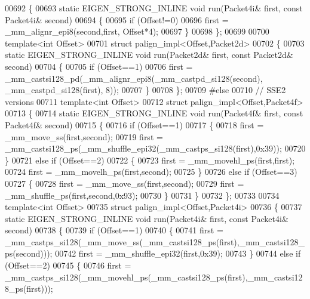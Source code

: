 \begin{DoxyCode}
{{00692 \{
00693   \textcolor{keyword}{static} EIGEN\_STRONG\_INLINE \textcolor{keywordtype}{void} run(Packet4i& first, \textcolor{keyword}{const} Packet4i& second)
00694   \{
00695     \textcolor{keywordflow}{if} (Offset!=0)
00696       first = \_mm\_alignr\_epi8(second,first, Offset*4);
00697   \}
00698 \};
00699 
00700 \textcolor{keyword}{template}<\textcolor{keywordtype}{int} Offset>
00701 \textcolor{keyword}{struct }palign\_impl<Offset,Packet2d>
00702 \{
00703   \textcolor{keyword}{static} EIGEN\_STRONG\_INLINE \textcolor{keywordtype}{void} run(Packet2d& first, \textcolor{keyword}{const} Packet2d& second)
00704   \{
00705     \textcolor{keywordflow}{if} (Offset==1)
00706       first = \_mm\_castsi128\_pd(\_mm\_alignr\_epi8(\_mm\_castpd\_si128(second), \_mm\_castpd\_si128(first), 8));
00707   \}
00708 \};
00709 \textcolor{preprocessor}{#else}
00710 \textcolor{comment}{// SSE2 versions}
00711 \textcolor{keyword}{template}<\textcolor{keywordtype}{int} Offset>
00712 \textcolor{keyword}{struct }palign\_impl<Offset,Packet4f>
00713 \{
00714   \textcolor{keyword}{static} EIGEN\_STRONG\_INLINE \textcolor{keywordtype}{void} run(Packet4f& first, \textcolor{keyword}{const} Packet4f& second)
00715   \{
00716     \textcolor{keywordflow}{if} (Offset==1)
00717     \{
00718       first = \_mm\_move\_ss(first,second);
00719       first = \_mm\_castsi128\_ps(\_mm\_shuffle\_epi32(\_mm\_castps\_si128(first),0x39));
00720     \}
00721     \textcolor{keywordflow}{else} \textcolor{keywordflow}{if} (Offset==2)
00722     \{
00723       first = \_mm\_movehl\_ps(first,first);
00724       first = \_mm\_movelh\_ps(first,second);
00725     \}
00726     \textcolor{keywordflow}{else} \textcolor{keywordflow}{if} (Offset==3)
00727     \{
00728       first = \_mm\_move\_ss(first,second);
00729       first = \_mm\_shuffle\_ps(first,second,0x93);
00730     \}
00731   \}
00732 \};
00733 
00734 \textcolor{keyword}{template}<\textcolor{keywordtype}{int} Offset>
00735 \textcolor{keyword}{struct }palign\_impl<Offset,Packet4i>
00736 \{
00737   \textcolor{keyword}{static} EIGEN\_STRONG\_INLINE \textcolor{keywordtype}{void} run(Packet4i& first, \textcolor{keyword}{const} Packet4i& second)
00738   \{
00739     \textcolor{keywordflow}{if} (Offset==1)
00740     \{
00741       first = \_mm\_castps\_si128(\_mm\_move\_ss(\_mm\_castsi128\_ps(first),\_mm\_castsi128\_ps(second)));
00742       first = \_mm\_shuffle\_epi32(first,0x39);
00743     \}
00744     \textcolor{keywordflow}{else} \textcolor{keywordflow}{if} (Offset==2)
00745     \{
00746       first = \_mm\_castps\_si128(\_mm\_movehl\_ps(\_mm\_castsi128\_ps(first),\_mm\_castsi128\_ps(first)));
}}
\end{DoxyCode}
